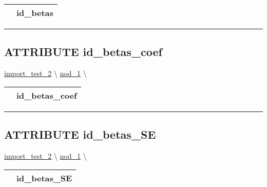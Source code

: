 {\renewcommand{\arraystretch}{1.5}
\begin{tabularx}{\textwidth}{|>{\raggedright\arraybackslash}l|X|}
\hline
\hspace{0pt}\mytexttt{\color{red} } & \textbf{id\_betas} \\
\hline
\end{tabularx}
}

\par


\rule{\linewidth}{0.5pt}
\subsection*{\textsf{\colorbox{headtoc}{\color{white} ATTRIBUTE}
id\_betas\_coef}}

\hypertarget{ecldoc:constants.id_betas_coef}{}
\hspace{0pt} \hyperlink{ecldoc:import_test_2}{import_test_2} \textbackslash 
\hspace{0pt} \hyperlink{ecldoc:Constants}{nod_1} \textbackslash 

{\renewcommand{\arraystretch}{1.5}
\begin{tabularx}{\textwidth}{|>{\raggedright\arraybackslash}l|X|}
\hline
\hspace{0pt}\mytexttt{\color{red} } & \textbf{id\_betas\_coef} \\
\hline
\end{tabularx}
}

\par


\rule{\linewidth}{0.5pt}
\subsection*{\textsf{\colorbox{headtoc}{\color{white} ATTRIBUTE}
id\_betas\_SE}}

\hypertarget{ecldoc:constants.id_betas_se}{}
\hspace{0pt} \hyperlink{ecldoc:import_test_2}{import_test_2} \textbackslash 
\hspace{0pt} \hyperlink{ecldoc:Constants}{nod_1} \textbackslash 

{\renewcommand{\arraystretch}{1.5}
\begin{tabularx}{\textwidth}{|>{\raggedright\arraybackslash}l|X|}
\hline
\hspace{0pt}\mytexttt{\color{red} } & \textbf{id\_betas\_SE} \\
\hline
\end{tabularx}
}

\par


